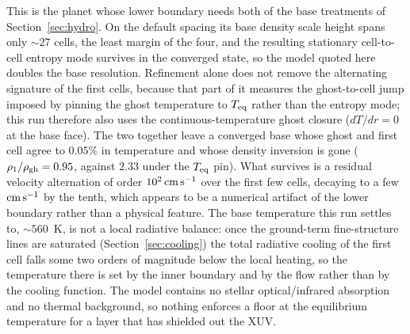 \documentclass[twocolumn]{aastex702}
\begin{document}
This is the planet whose lower boundary needs both of the base treatments of
Section~\ref{sec:hydro}. On the default spacing its base density scale height spans only
${\sim}27$ cells, the least margin of the four, and the resulting stationary cell-to-cell
entropy mode survives in the converged state, so the model quoted here doubles the base
resolution. Refinement alone does not remove the alternating signature of the first cells,
because that part of it measures the ghost-to-cell jump imposed by pinning the ghost
temperature to $T_{\rm eq}$ rather than the entropy mode; this run therefore also uses the
continuous-temperature ghost closure ($dT/dr=0$ at the base face). The two together leave a
converged base whose ghost and first cell agree to $0.05\%$ in temperature and whose density
inversion is gone ($\rho_1/\rho_{\rm gh}=0.95$, against $2.33$ under the $T_{\rm eq}$ pin).
What survives is a residual velocity alternation of order $10^{2}\,{\rm cm\,s^{-1}}$ over
the first few cells, decaying to a few ${\rm cm\,s^{-1}}$ by the tenth, which appears to be
a numerical artifact of the lower boundary rather than a physical feature. The base
temperature this run settles to, ${\sim}560$~K, is not a local radiative balance: once the
ground-term fine-structure lines are saturated (Section~\ref{sec:cooling}) the total
radiative cooling of the first cell falls some two orders of magnitude below the local
heating, so the temperature there is set by the inner boundary and by the flow rather than
by the cooling function. The model contains no stellar optical/infrared absorption and no
thermal background, so nothing enforces a floor at the equilibrium temperature for a layer
that has shielded out the XUV.
\end{document}
